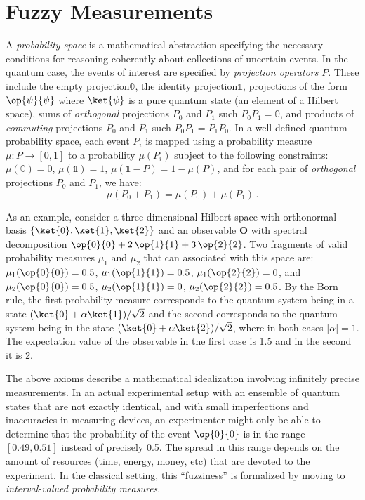 \documentclass[english,reprint, aps, prl,superscriptaddress, showpacs,
showkeys, longbibliography, amsmath, amssymb]{revtex4-1}
\theoremstyle{plain}
\theoremstyle{definition}
\newcommand{\proj}[1]{\op{#1}{#1}}
\newcommand{\nb}{\nolinebreak[1] }
\begin{document}
\section{Fuzzy Measurements}
 \label{sec:fuzzy}
A \emph{probability space} is a mathematical abstraction specifying
the necessary conditions for reasoning coherently about collections of
uncertain events\nb\cite{Kolmogorov1950}. In the quantum case, the
events of interest are specified by \emph{projection operators}
$P$. These include the empty projection\nb$\mathbb{0}$, the identity
projection\nb$\mathbb{1}$, projections of the form $\proj{\psi}$ where
$\ket{\psi}$ is a pure quantum state (an element of a Hilbert space),
sums of \emph{orthogonal} projections $P_0$ and $P_1$ such
$P_0P_1=\mathbb{0}$, and products of \emph{commuting} projections
$P_0$ and $P_1$ such $P_0P_1=P_1P_0$. In a well-defined quantum
probability
space\nb\cite{10.2307/2308516,gleason1957,Redhead1987-REDINA,Maassen2010},
each event $P_{i}$ is mapped using a probability measure
$\mu : P \rightarrow [0,1]$ to a probability $\mu(P_{i})$ subject to
the following constraints: $\mu(\mathbb{0})=0$, $\mu(\mathbb{1})=1$,
$\mu\left(\mathbb{1}-P\right)=1-\mu\left(P\right)$, and for each pair
of \emph{orthogonal} projections $P_{0}$ and $P_{1}$, we have:
\begin{equation}
{\mu}\left(P_{0}+P_{1}\right)={\mu}\left(P_{0}\right)+{\mu}\left(P_{1}\right)\,.\label{eq:QuantumProbability-Addition}
\end{equation}

As an example, consider a three-dimensional Hilbert space with
orthonormal basis $\{\ket{0},\ket{1},\ket{2}\}$ and an observable
$\mathbf{O}$ with spectral decomposition
$\proj{0} + 2\,\proj{1} + 3\,\proj{2}$. Two fragments of valid
probability measures $\mu_1$ and $\mu_2$ that can associated with this
space are: $\mu_1(\proj{0}) = 0.5$, $\mu_1(\proj{1}) = 0.5$,
$\mu_1(\proj{2}) = 0$, and $\mu_2(\proj{0}) = 0.5$,
$\mu_2(\proj{1}) = 0$, $\mu_2(\proj{2}) = 0.5$. By the Born rule, the
first probability measure corresponds to the quantum system being in a
state $(\ket{0}+\alpha\ket{1})/\sqrt{2}$ and the second corresponds to
the quantum system being in the state
$(\ket{0}+\alpha\ket{2})/\sqrt{2}$, where in both cases
$|\alpha|=1$. The expectation value of the observable in the first
case is 1.5 and in the second it is 2.

The above axioms describe a mathematical idealization involving
infinitely precise measurements. In an actual experimental setup with
an ensemble of quantum states that are not exactly identical, and with
small imperfections and inaccuracies in measuring devices, an
experimenter might only be able to determine that the probability of
the event $\proj{0}$ is in the range $[0.49,0.51]$ instead of
precisely 0.5. The spread in this range depends on the amount of
resources (time, energy, money, etc) that are devoted to the
experiment. In the classical setting, this ``fuzziness'' is formalized
by moving to \emph{interval-valued probability measures}.
\end{document}
